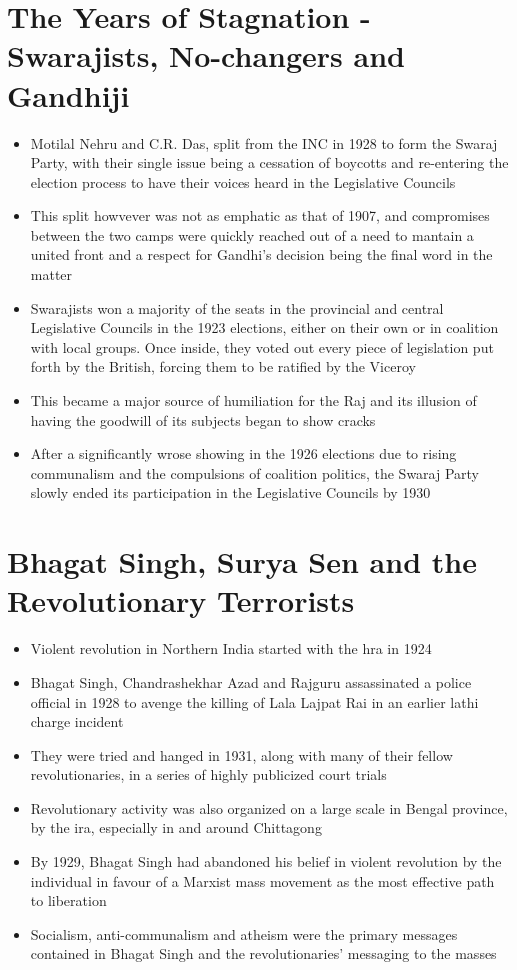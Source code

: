 \section{The Years of Stagnation - Swarajists, No-changers and Gandhiji}
\begin{itemize}
    \item Motilal Nehru and C.R. Das, split from the INC in 1928 to form the Swaraj Party, with their single issue being a cessation of boycotts and re-entering the election process to have their voices heard in the Legislative Councils
    \item This split howvever was not as emphatic as that of 1907, and compromises between the two camps were quickly reached out of a need to mantain a united front and a respect for Gandhi's decision being the final word in the matter
    \item Swarajists won a majority of the seats in the provincial and central Legislative Councils in the 1923 elections, either on their own or in coalition with local groups. Once inside, they voted out every piece of legislation put forth by the British, forcing them to be ratified by the Viceroy
    \item This became a major source of humiliation for the Raj and its illusion of having the goodwill of its subjects began to show cracks
    \item After a significantly wrose showing in the 1926 elections due to rising communalism and the compulsions of coalition politics, the Swaraj Party slowly ended its participation in the Legislative Councils by 1930
\end{itemize}

\section{Bhagat Singh, Surya Sen and the Revolutionary Terrorists}
\begin{itemize}
    \item Violent revolution in Northern India started with the \gls{hra} in 1924
    \item Bhagat Singh, Chandrashekhar Azad and Rajguru assassinated a police official in 1928 to avenge the killing of Lala Lajpat Rai in an earlier lathi charge incident
    \item They were tried and hanged in 1931, along with many of their fellow revolutionaries, in a series of highly publicized court trials
    \item Revolutionary activity was also organized on a large scale in Bengal province, by the \gls{ira}, especially in and around Chittagong
    \item By 1929, Bhagat Singh had abandoned his belief in violent revolution by the individual in favour of a Marxist mass movement as the most effective path to liberation
    \item Socialism, anti-communalism and atheism were the primary messages contained in Bhagat Singh and the revolutionaries' messaging to the masses
\end{itemize}

